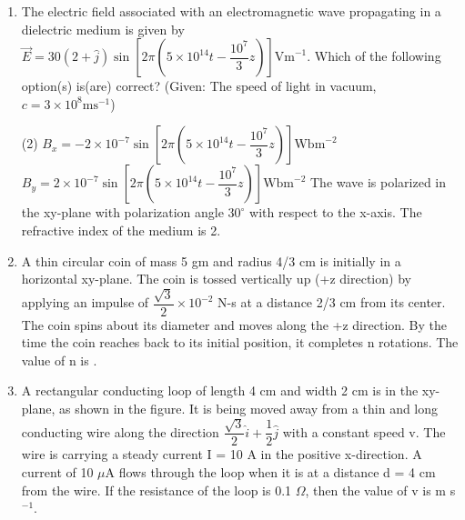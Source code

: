\documentclass{article}
\renewcommand{\frac}[2]{\dfrac{#1}{#2}}
\begin{document}
\begin{enumerate}
    \item The electric field associated with an electromagnetic wave propagating in a dielectric medium is given by $\vec{E} = 30(2 + \hat{j})\sin\left[2\pi(5 \times 10^{14}t - \frac{10^{7}}{3} z)\right] \mathrm{Vm}^{-1}$. Which of the following option(s) is(are) correct? (Given: The speed of light in vacuum, $c = 3 \times 10^{8} \mathrm{ms}^{-1}$)
        \begin{tasks}(2)
            \task $B_{x} = -2 \times 10^{-7}\sin\left[2\pi(5 \times 10^{14}t - \frac{10^{7}}{3} z)\right] \mathrm{Wbm}^{-2}$
            \task $B_{y} = 2 \times 10^{-7}\sin\left[2\pi(5 \times 10^{14}t - \frac{10^{7}}{3} z)\right] \mathrm{Wbm}^{-2}$
            \task The wave is polarized in the xy-plane with polarization angle $30^{\circ}$ with respect to the x-axis.
            \task The refractive index of the medium is 2.
        \end{tasks}

    \item A thin circular coin of mass 5 gm and radius 4/3 cm is initially in a horizontal xy-plane. The coin is tossed vertically up (+z direction) by applying an impulse of $\frac{\sqrt{3}}{2} \times 10^{-2}$ N-s at a distance 2/3 cm from its center. The coin spins about its diameter and moves along the +z direction. By the time the coin reaches back to its initial position, it completes n rotations. The value of n is \underline{\hspace{2em}}.
    
    \begin{center}
    \end{center}
    
    \item A rectangular conducting loop of length 4 cm and width 2 cm is in the xy-plane, as shown in the figure. It is being moved away from a thin and long conducting wire along the direction $\frac{\sqrt{3}}{2} \hat{i} + \frac{1}{2} \hat{j}$ with a constant speed v. The wire is carrying a steady current I = 10 A in the positive x-direction. A current of 10 $\mu$A flows through the loop when it is at a distance d = 4 cm from the wire. If the resistance of the loop is 0.1 $\Omega$, then the value of v is \underline{\hspace{2em}} m s$^{-1}$.
    
    \begin{center}
    \end{center}


\end{enumerate}
\end{document}
